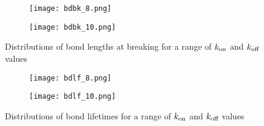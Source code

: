 \documentclass{article}
\newcommand{\tn}{\textnormal}
\begin{document}
\begin{figure}[h]
  \centering
  \begin{subfigure}{0.49\textwidth}
    \texttt{[image: bdbk\_8.png]}
  \end{subfigure}
  \hfill
  \begin{subfigure}{0.49\textwidth}
    \texttt{[image: bdbk\_10.png]}
  \end{subfigure}
  \caption{Distributions of bond lengths at breaking for a range of
    $k_\tn{on}$ and $k_\tn{off}$ values}
  \label{fig:bdbk}
\end{figure}

\begin{figure}[h]
  \centering
  \begin{subfigure}{0.49\textwidth}
    \texttt{[image: bdlf\_8.png]}
  \end{subfigure}
  \hfill
  \begin{subfigure}{0.49\textwidth}
    \texttt{[image: bdlf\_10.png]}
  \end{subfigure}
  \caption{Distributions of bond lifetimes for a range of $k_\tn{on}$
    and $k_\tn{off}$ values}
  \label{fig:bdlf}
\end{figure}

% 
% 
\end{document}
